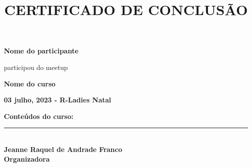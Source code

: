 \documentclass[14pt,a4paper]{extarticle}
\title{CERTIFICADO DE CONCLUSÃO}
\author{}
\date{}
\providecommand{\opensans}{\normalfont}
\begin{document}
\opensans

\maketitle

\begin{center}

\Large \textbf{
Nome do participante
}

\vspace{1.3cm}

\normalsize
participou do meetup 

\vspace{0.8cm}

\Large \textbf{
Nome do curso 
}
\normalsize

\large \textbf{
03 julho, 2023 - R-Ladies Natal
}

\vspace{0.5cm}

\Large \textbf{
Conteúdos do curso:
}

\vspace{0.5cm}

\normalsize
\begin{varwidth}{0.8\textwidth}


\end{varwidth}

\vfill




\rule[0in]{3in}{1pt}\\
\textbf{Jeanne Raquel de Andrade Franco\\
        Organizadora}\\
\vspace{0.8cm}

\end{center}
\end{document}
